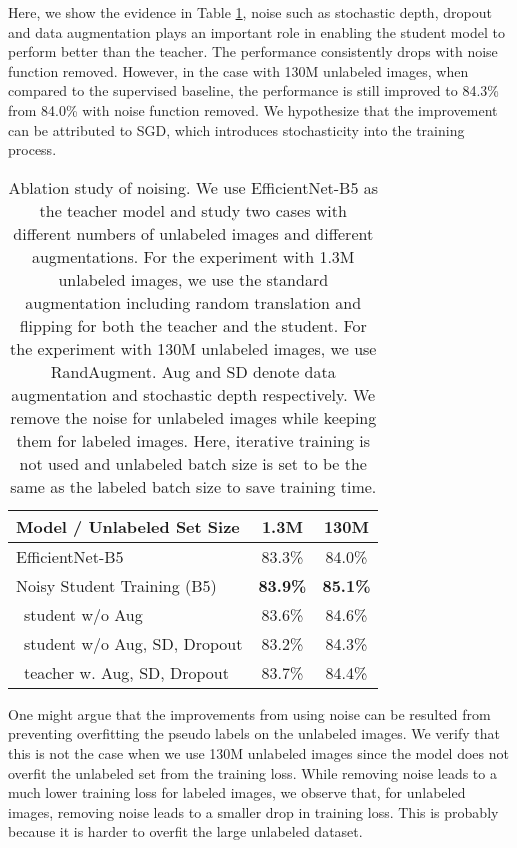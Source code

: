 \documentclass[10pt,twocolumn,letterpaper]{article}
\begin{document}
Here, we show the evidence in Table \ref{tab:abl_noise}, noise such as stochastic depth, dropout and data augmentation plays an important role in enabling the student model to perform better than the teacher. The performance consistently drops with noise function removed. 
However, in the case with 130M  unlabeled images, when compared to the supervised baseline, the performance is still improved to 84.3\% from 84.0\% with noise function removed. We hypothesize that the improvement can be attributed to SGD, which introduces stochasticity into the training process. 

\begin{table}[h!]
\small
    \centering                                                                 
        \begin{tabular}{l|cc}                                                
        \toprule 
        Model / Unlabeled Set Size &    1.3M & 130M  \\
        \midrule      
	    EfficientNet-B5  & 83.3\% & 84.0\% \\
	    \midrule
		Noisy Student Training (B5) & \bf 83.9\% & \bf 85.1\% \\
		\  student w/o Aug & 83.6\% & 84.6\% \\
		\  student w/o Aug, SD, Dropout & 83.2\% & 84.3\% \\
		\  teacher w. Aug, SD, Dropout  & 83.7\% & 84.4\% \\
        \bottomrule
        \end{tabular}
    \caption{Ablation study of noising. We use EfficientNet-B5 as the teacher model and study two cases with different numbers of unlabeled images and different augmentations. For the experiment with 1.3M unlabeled images, we use the standard augmentation including random translation and flipping for both the teacher and the student. For the experiment with 130M unlabeled images, we use RandAugment.  Aug and SD denote data augmentation and stochastic depth respectively. We remove the noise for unlabeled images while keeping them for labeled images. Here, iterative training is not used and unlabeled batch size is set to be the same as the labeled batch size to save training time.}
    \label{tab:abl_noise}
\end{table}




One might argue that the improvements from using noise can be resulted from preventing overfitting the pseudo labels on the unlabeled images.
We verify that this is not the case when we use 130M unlabeled images since the model does not overfit the unlabeled set from the training loss. While removing noise  leads to a much lower training loss for labeled images, we observe that, for unlabeled images, removing noise leads to a smaller drop in training loss. This is probably because it is harder to overfit the large unlabeled dataset.
\end{document}
